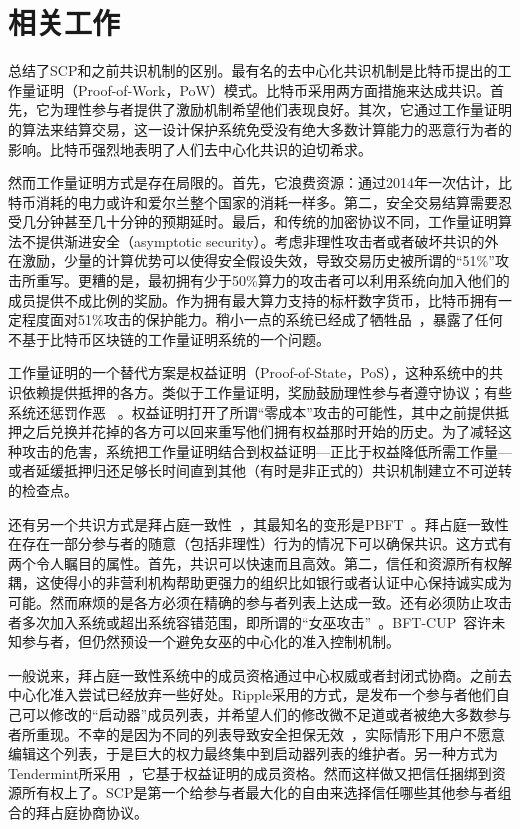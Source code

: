 \section{相关工作}

总结了SCP和之前共识机制的区别。最有名的去中心化共识机制是比特币提出的工作量证明（Proof-of-Work，PoW）模式。比特币采用两方面措施来达成共识。首先，它为理性参与者提供了激励机制希望他们表现良好。其次，它通过工作量证明的算法来结算交易，这一设计保护系统免受没有绝大多数计算能力的恶意行为者的影响。比特币强烈地表明了人们去中心化共识的迫切希求。

然而工作量证明方式是存在局限的。首先，它浪费资源：通过2014年一次估计，比特币消耗的电力或许和爱尔兰整个国家的消耗一样多。第二，安全交易结算需要忍受几分钟甚至几十分钟的预期延时。最后，和传统的加密协议不同，工作量证明算法不提供渐进安全（asymptotic security）。考虑非理性攻击者或者破坏共识的外在激励，少量的计算优势可以使得安全假设失效，导致交易历史被所谓的``51\%''攻击所重写。更糟的是，最初拥有少于50\%算力的攻击者可以利用系统向加入他们的成员提供不成比例的奖励。作为拥有最大算力支持的标杆数字货币，比特币拥有一定程度面对51\%攻击的保护能力。稍小一点的系统已经成了牺牲品~\cite{attack_bbt2013,attack_cb2013}，暴露了任何不基于比特币区块链的工作量证明系统的一个问题。

工作量证明的一个替代方案是权益证明（Proof-of-State，PoS），这种系统中的共识依赖提供抵押的各方。类似于工作量证明，奖励鼓励理性参与者遵守协议；有些系统还惩罚作恶~\cite{slasher2014, neucoin2015} 。权益证明打开了所谓``零成本''攻击的可能性，其中之前提供抵押之后兑换并花掉的各方可以回来重写他们拥有权益那时开始的历史。为了减轻这种攻击的危害，系统把工作量证明结合到权益证明---正比于权益降低所需工作量---或者延缓抵押归还足够长时间直到其他（有时是非正式的）共识机制建立不可逆转的检查点。

还有另一个共识方式是拜占庭一致性~\cite{Pease:1980:RAP:322186.322188,Lamport:1982:BGP:357172.357176}，其最知名的变形是PBFT~\cite{Castro:1999:PBFT}。拜占庭一致性在存在一部分参与者的随意（包括非理性）行为的情况下可以确保共识。这方式有两个令人瞩目的属性。首先，共识可以快速而且高效。第二，信任和资源所有权解耦，这使得小的非营利机构帮助更强力的组织比如银行或者认证中心保持诚实成为可能。然而麻烦的是各方必须在精确的参与者列表上达成一致。还有必须防止攻击者多次加入系统或超出系统容错范围，即所谓的``女巫攻击''~\cite{Douceur:2002:SA:646334.687813}。BFT-CUP~\cite{Alchieri:2008:BCU:1496310.1496316}容许未知参与者，但仍然预设一个避免女巫的中心化的准入控制机制。

一般说来，拜占庭一致性系统中的成员资格通过中心权威或者封闭式协商。之前去中心化准入尝试已经放弃一些好处。Ripple采用的方式，是发布一个参与者他们自己可以修改的``启动器''成员列表，并希望人们的修改微不足道或者被绝大多数参与者所重现。不幸的是因为不同的列表导致安全担保无效~\cite{ripple2014}，实际情形下用户不愿意编辑这个列表，于是巨大的权力最终集中到启动器列表的维护者。另一种方式为Tendermint所采用~\cite{tendermint2014}，它基于权益证明的成员资格。然而这样做又把信任捆绑到资源所有权上了。SCP是第一个给参与者最大化的自由来选择信任哪些其他参与者组合的拜占庭协商协议。